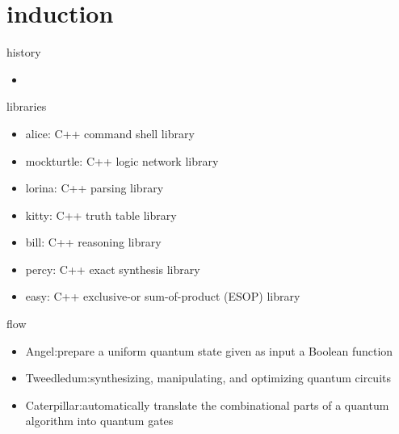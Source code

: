 \section{induction}
\begin{frame}{history}
  \begin{itemize}
    \item 
  \end{itemize}
\end{frame}
\begin{frame}{libraries}
  \begin{itemize}
    \item alice: C++ command shell library
    \item mockturtle: C++ logic network library
    \item lorina: C++ parsing library
    \item kitty: C++ truth table library
    \item bill: C++ reasoning library
    \item percy: C++ exact synthesis library
    \item easy: C++ exclusive-or sum-of-product (ESOP) library
  \end{itemize}
\end{frame}
\begin{frame}{flow}
  \begin{itemize}
    \item Angel:prepare a uniform quantum state
    given as input a Boolean function
    \item Tweedledum:synthesizing,
    manipulating, and optimizing quantum circuits
    \item Caterpillar:automatically translate the combinational parts of a quantum
    algorithm into quantum gates
  \end{itemize}
\end{frame}